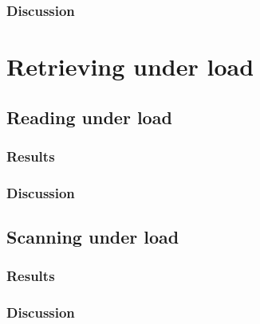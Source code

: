 \subsubsection{Discussion}

\section{Retrieving under load}
\label{ch:evaluation:se:retrievingUnderLoad}

\subsection{Reading under load}

\subsubsection{Results}

\subsubsection{Discussion}

\subsection{Scanning under load}

\subsubsection{Results}

\subsubsection{Discussion}
